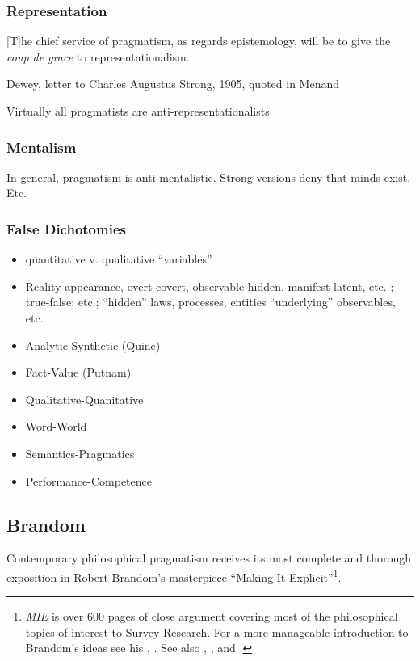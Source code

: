 \documentclass[11pt,twoside]{article}
\newcommand{\SR}{Survey Research}
\newcommand{\MIE}{\textit{MIE}}
\begin{document}
\subsubsection{Representation}

\epigraph{ [T]he chief service of pragmatism, as regards epistemology,
  will be to give the \textit{coup de grace} to representationalism.}
         {Dewey, letter to Charles Augustus Strong, 1905, quoted in Menand}

Virtually all pragmatists are anti-representationalists

\subsubsection{Mentalism}

In general, pragmatism is anti-mentalistic.  Strong versions deny that
minds exist.  Etc.

\subsubsection{False Dichotomies}

\begin{itemize}
\item quantitative v. qualitative ``variables''
\item Reality-appearance, overt-covert, observable-hidden,
  manifest-latent, etc. ; true-false; etc.; ``hidden'' laws,
  processes, entities ``underlying'' observables, etc.
\item Analytic-Synthetic (Quine)
\item Fact-Value (Putnam)
\item Qualitative-Quanitative
\item Word-World
\item Semantics-Pragmatics
\item Performance-Competence
\end{itemize}

\subsection{Brandom}

Contemporary philosophical pragmatism receives its most complete and
thorough exposition in Robert Brandom's masterpiece \enquote{Making It
  Explicit}\footnote{\MIE{} is over 600 pages of close argument covering most of the philosophical topics of interest to \SR{}.  For a more manageable introduction to Brandom's ideas see his \parencite{brandom_precis_1997}, \parencite{brandom_articulating_2001}.  See also \parencite{brandom_perspectives_2011}, \parencite{brandom_reason_2009}, and \parencite{brandom_between_2008}.}.
\end{document}
